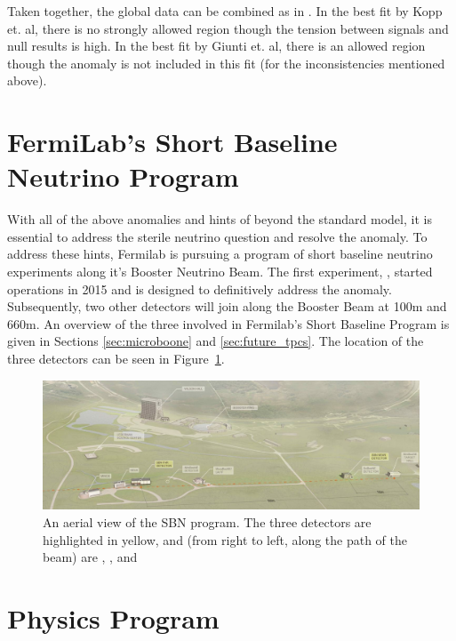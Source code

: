 Taken together, the global data can be combined as in \cite{Kopp:2013vaa,Giunti:2011gz}.  In the best fit by Kopp et. al, there is no strongly allowed region though the tension between signals and null results is high.  In the best fit by Giunti et. al, there is an allowed region though the \MB anomaly is not included in this fit (for the inconsistencies mentioned above).


\section{FermiLab's Short Baseline Neutrino Program}

\label{sec:sbn_detectors}
With all of the above anomalies and hints of beyond the standard model, it is essential to address the sterile neutrino question and resolve the \MB anomaly.  To address these hints, Fermilab is pursuing a program of short baseline neutrino experiments along it's Booster Neutrino Beam.  The first experiment, \uboone, started operations in 2015 and is designed to definitively address the \MB anomaly.  Subsequently, two other detectors will join \uboone along the Booster Beam at 100m and 660m.  An overview of the three \lartpcs involved in Fermilab's Short Baseline Program is given in Sections \ref{sec:microboone} and \ref{sec:future_tpcs}.  The location of the three detectors can be seen in Figure~\ref{fig:sbn_birdseyeview}.

\begin{figure}[htbp]
  \centering
  \includegraphics[width=\textwidth]{sbn_figures/SBN_Map.jpeg}
  \caption[SBN Detector Locations]{An aerial view of the SBN program.  The three detectors are highlighted in yellow, and (from right to left, along the path of the beam) are \sbnd, \uboone, and \icarus}
  \label{fig:sbn_birdseyeview}
\end{figure}

\section{Physics Program}

